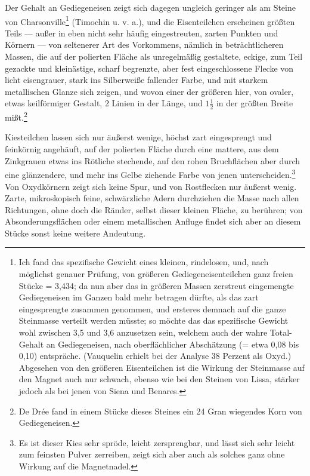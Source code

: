 \documentclass[a4paper, 11pt, oneside, german]{article}
\begin{document}
Der Gehalt an Gediegeneisen zeigt sich dagegen ungleich geringer als am Steine von Charsonville\footnote{Ich fand das spezifische Gewicht eines kleinen, rindelosen, und, nach möglichst genauer Prüfung, von größeren Gediegeneisenteilchen ganz freien Stücke = 3,434; da nun aber das in größeren Massen zerstreut eingemengte Gediegeneisen im Ganzen bald mehr betragen dürfte, als das zart eingesprengte zusammen genommen, und ersteres demnach auf die ganze Steinmasse verteilt werden müsste; so möchte das das spezifische Gewicht wohl zwischen 3,5 und 3,6 anzusetzen sein, welchem auch der wahre Total-Gehalt an Gediegeneisen, nach oberflächlicher Abschätzung (= etwa 0,08 bis 0,10) entspräche. (Vauquelin erhielt bei der Analyse 38 Perzent als Oxyd.) Abgesehen von den größeren Eisenteilchen ist die Wirkung der Steinmasse auf den Magnet auch nur schwach, ebenso wie bei den Steinen von Lissa, stärker jedoch als bei jenen von Siena und Benares.} (Timochin u. v. a.), und die Eisenteilchen erscheinen größten Teils --- außer in eben nicht sehr häufig eingestreuten, zarten Punkten und Körnern --- von seltenerer Art des Vorkommens, nämlich in beträchtlicheren Massen, die auf der polierten Fläche als unregelmäßig gestaltete, eckige, zum Teil gezackte und kleinästige, scharf begrenzte, aber fest eingeschlossene Flecke von licht eisengrauer, stark ins Silberweiße fallender Farbe, und mit starkem metallischen Glanze sich zeigen, und wovon einer der größeren hier, von ovaler, etwas keilförmiger Gestalt, 2 Linien in der Länge, und $1\frac{1}{2}$ in der größten Breite mißt.\footnote{De Drée fand in einem Stücke dieses Steines ein 24 Gran wiegendes Korn von Gediegeneisen.}

Kiesteilchen lassen sich nur äußerst wenige, höchst zart eingesprengt und feinkörnig angehäuft, auf der polierten Fläche durch eine mattere, aus dem Zinkgrauen etwas ins Rötliche stechende, auf den rohen Bruchflächen aber durch eine glänzendere, und mehr ins Gelbe ziehende Farbe von jenen unterscheiden.\footnote{Es ist dieser Kies sehr spröde, leicht zersprengbar, und lässt sich sehr leicht zum feinsten Pulver zerreiben, zeigt sich aber auch als solches ganz ohne Wirkung auf die Magnetnadel.} Von Oxydkörnern zeigt sich keine Spur, und von Rostflecken nur äußerst wenig. Zarte, mikroskopisch feine, schwärzliche Adern durchziehen die Masse nach allen Richtungen, ohne doch die Ränder, selbst dieser kleinen Fläche, zu berühren; von Absonderungsflächen oder einem metallischen Anfluge findet sich aber an diesem Stücke sonst keine weitere Andeutung.
\end{document}
